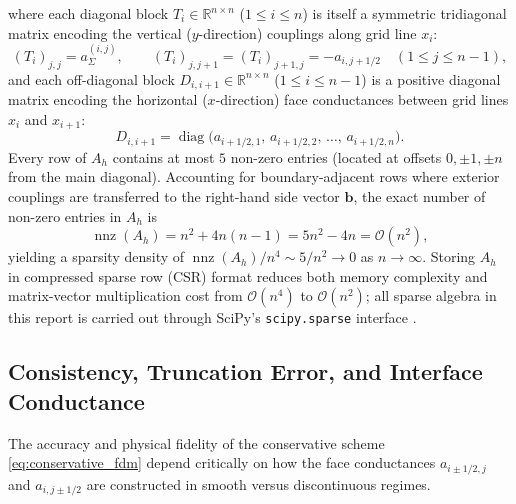 \documentclass[11pt,a4paper]{article}
\theoremstyle{definition}
\theoremstyle{remark}
\begin{document}
where each diagonal block $T_i \in \mathbb{R}^{n \times n}$ ($1 \le i \le n$) is itself a symmetric tridiagonal matrix encoding the vertical ($y$-direction) couplings along grid line $x_i$:
\begin{equation}
	(T_i)_{j,j} = a_\Sigma^{(i,j)}, \qquad (T_i)_{j,j+1} = (T_i)_{j+1,j} = -a_{i,j+1/2} \quad (1 \le j \le n-1),
	\label{eq:Ti_def}
\end{equation}
and each off-diagonal block $D_{i,i+1} \in \mathbb{R}^{n \times n}$ ($1 \le i \le n-1$) is a positive diagonal matrix encoding the horizontal ($x$-direction) face conductances between grid lines $x_i$ and $x_{i+1}$:
\begin{equation}
	D_{i,i+1} = \operatorname{diag}\bigl(a_{i+1/2,1},\, a_{i+1/2,2},\, \dots,\, a_{i+1/2,n}\bigr).
	\label{eq:Di_def}
\end{equation}
Every row of $A_h$ contains at most $5$ non-zero entries (located at offsets $0, \pm 1, \pm n$ from the main diagonal). Accounting for boundary-adjacent rows where exterior couplings are transferred to the right-hand side vector $\bm{b}$, the exact number of non-zero entries in $A_h$ is
\begin{equation}
	\operatorname{nnz}(A_h) = n^2 + 4n(n-1) = 5n^2 - 4n = \mathcal{O}(n^2),
	\label{eq:nnz_count}
\end{equation}
yielding a sparsity density of $\operatorname{nnz}(A_h)/n^4 \sim 5/n^2 \to 0$ as $n \to \infty$. Storing $A_h$ in compressed sparse row (CSR) format reduces both memory complexity and matrix-vector multiplication cost from $\mathcal{O}(n^4)$ to $\mathcal{O}(n^2)$; all sparse algebra in this report is carried out through SciPy's \texttt{scipy.sparse} interface \cite{virtanen2020scipy, harris2020numpy}.

\subsection{Consistency, Truncation Error, and Interface Conductance}
The accuracy and physical fidelity of the conservative scheme \eqref{eq:conservative_fdm} depend critically on how the face conductances $a_{i\pm 1/2,j}$ and $a_{i,j\pm 1/2}$ are constructed in smooth versus discontinuous regimes.
\end{document}
